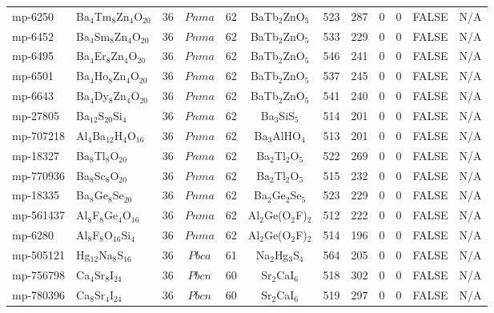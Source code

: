 {\begin{longtable}{llcccccccccc}
    mp-6250 & Ba$_{4}$Tm$_{8}$Zn$_{4}$O$_{20}$ & 36    & $Pnma$ & 62    & BaTb$_{2}$ZnO$_{5}$ & 523   & 287   & 0     & 0     & FALSE & N/A \\
    mp-6452 & Ba$_{4}$Sm$_{8}$Zn$_{4}$O$_{20}$ & 36    & $Pnma$ & 62    & BaTb$_{2}$ZnO$_{5}$ & 533   & 229   & 0     & 0     & FALSE & N/A \\
    mp-6495 & Ba$_{4}$Er$_{8}$Zn$_{4}$O$_{20}$ & 36    & $Pnma$ & 62    & BaTb$_{2}$ZnO$_{5}$ & 546   & 241   & 0     & 0     & FALSE & N/A \\
    mp-6501 & Ba$_{4}$Ho$_{8}$Zn$_{4}$O$_{20}$ & 36    & $Pnma$ & 62    & BaTb$_{2}$ZnO$_{5}$ & 537   & 245   & 0     & 0     & FALSE & N/A \\
    mp-6643 & Ba$_{4}$Dy$_{8}$Zn$_{4}$O$_{20}$ & 36    & $Pnma$ & 62    & BaTb$_{2}$ZnO$_{5}$ & 541   & 240   & 0     & 0     & FALSE & N/A \\
    mp-27805 & Ba$_{12}$S$_{20}$Si$_{4}$ & 36    & $Pnma$ & 62    & Ba$_{3}$SiS$_{5}$ & 514   & 201   & 0     & 0     & FALSE & N/A \\
    mp-707218 & Al$_{4}$Ba$_{12}$H$_{4}$O$_{16}$ & 36    & $Pnma$ & 62    & Ba$_{3}$AlHO$_{4}$ & 513   & 201   & 0     & 0     & FALSE & N/A \\
    mp-18327 & Ba$_{8}$Tl$_{8}$O$_{20}$ & 36    & $Pnma$ & 62    & Ba$_{2}$Tl$_{2}$O$_{5}$ & 522   & 269   & 0     & 0     & FALSE & N/A \\
    mp-770936 & Ba$_{8}$Sc$_{8}$O$_{20}$ & 36    & $Pnma$ & 62    & Ba$_{2}$Tl$_{2}$O$_{5}$ & 515   & 232   & 0     & 0     & FALSE & N/A \\
    mp-18335 & Ba$_{8}$Ge$_{8}$Se$_{20}$ & 36    & $Pnma$ & 62    & Ba$_{2}$Ge$_{2}$Se$_{5}$ & 523   & 229   & 0     & 0     & FALSE & N/A \\
    mp-561437 & Al$_{8}$F$_{8}$Ge$_{4}$O$_{16}$ & 36    & $Pnma$ & 62    & Al$_{2}$Ge(O$_{2}$F)$_{2}$ & 512   & 222   & 0     & 0     & FALSE & N/A \\
    mp-6280 & Al$_{8}$F$_{8}$O$_{16}$Si$_{4}$ & 36    & $Pnma$ & 62    & Al$_{2}$Ge(O$_{2}$F)$_{2}$ & 514   & 196   & 0     & 0     & FALSE & N/A \\
    mp-505121 & Hg$_{12}$Na$_{8}$S$_{16}$ & 36    & $Pbca$ & 61    & Na$_{2}$Hg$_{3}$S$_{4}$ & 564   & 205   & 0     & 0     & FALSE & N/A \\
    mp-756798 & Ca$_{4}$Sr$_{8}$I$_{24}$ & 36    & $Pbcn$ & 60    & Sr$_{2}$CaI$_{6}$ & 518   & 302   & 0     & 0     & FALSE & N/A \\
    mp-780396 & Ca$_{8}$Sr$_{4}$I$_{24}$ & 36    & $Pbcn$ & 60    & Sr$_{2}$CaI$_{6}$ & 519   & 297   & 0     & 0     & FALSE & N/A \\

\end{longtable}}
